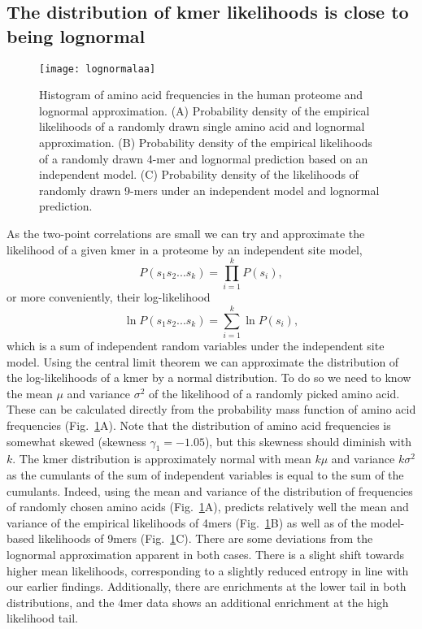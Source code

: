 \documentclass[superscriptaddress,twocolumn,pre]{revtex4}
\newcommand{\<}{\langle}
\renewcommand{\>}{\rangle}
\begin{document}
\subsection{The distribution of kmer likelihoods is close to being lognormal}

\begin{figure}
    \texttt{[image: lognormalaa]}
    \caption{Histogram of amino acid frequencies in the human proteome and lognormal approximation. (A) Probability density of the empirical likelihoods of a randomly drawn single amino acid and lognormal approximation. (B) Probability density of the empirical likelihoods of a randomly drawn 4-mer and lognormal prediction based on an independent model.
    (C) Probability density of the likelihoods of randomly drawn 9-mers under an independent model and lognormal prediction.
    \label{figlognormalaa}
    }
\end{figure}

As the two-point correlations are small we can try and approximate the likelihood of a given kmer in a proteome by an independent site model,
\begin{equation}
    P(s_1s_2 ... s_k) = \prod_{i=1}^k P(s_i),
\end{equation}
or more conveniently, their log-likelihood
\begin{equation}
    \ln P(s_1s_2 ... s_k) = \sum_{i=1}^k \ln P(s_i),
\end{equation}
which is a sum of independent random variables under the independent site model.
Using the central limit theorem we can approximate the distribution of the log-likelihoods of a kmer by a normal distribution. To do so we need to know the mean $\mu$ and variance $\sigma^2$ of the likelihood of a randomly picked amino acid. These can be calculated directly from the probability mass function of amino acid frequencies (Fig.~\ref{figlognormalaa}A). Note that the distribution of amino acid frequencies is somewhat skewed (skewness $\gamma_1 = -1.05$), but this skewness should diminish with $k$. The kmer distribution is approximately normal with mean $k \mu$ and variance $k \sigma^2$ as the cumulants of the sum of independent variables is equal to the sum of the cumulants.  Indeed, using the mean and variance of the distribution of frequencies of randomly chosen amino acids (Fig.~\ref{figlognormalaa}A), predicts relatively well the mean and variance of the empirical likelihoods of 4mers (Fig.~\ref{figlognormalaa}B) as well as of the model-based likelihoods of 9mers (Fig.~\ref{figlognormalaa}C). There are some deviations from the lognormal approximation apparent in both cases. There is a slight shift towards higher mean likelihoods, corresponding to a slightly reduced entropy in line with our earlier findings. Additionally, there are enrichments at the lower tail in both distributions, and the 4mer data shows an additional enrichment at the high likelihood tail.
\end{document}
